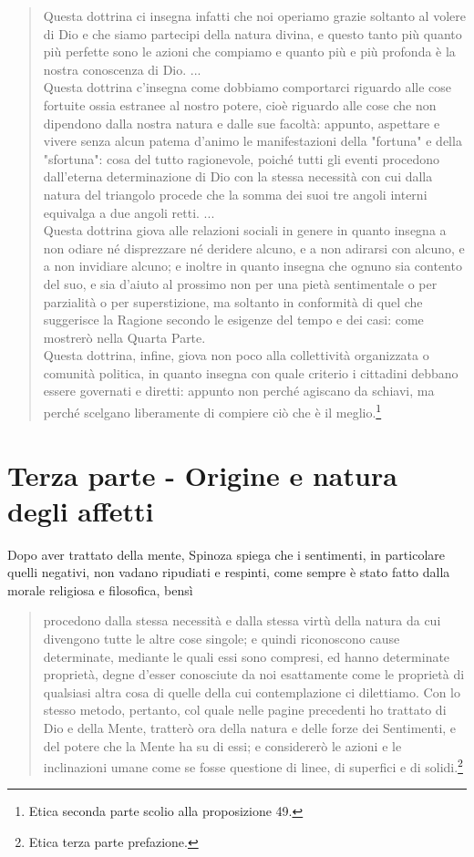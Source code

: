 \begin{quotation}
	\small Questa dottrina ci insegna infatti che noi operiamo grazie soltanto al volere di Dio e
	che siamo partecipi della natura divina, e questo tanto più quanto più perfette sono le azioni che compiamo e quanto più e più profonda è la nostra conoscenza di Dio. ...\\
	Questa dottrina c’insegna come dobbiamo comportarci riguardo alle cose fortuite ossia estranee al nostro potere, cioè riguardo alle cose che non dipendono dalla nostra natura
	e dalle sue facoltà: appunto, aspettare e vivere senza alcun patema d’animo le manifestazioni della "fortuna" e della "sfortuna": cosa del tutto ragionevole, poiché tutti gli eventi procedono dall’eterna determinazione di Dio con la stessa necessità con cui dalla natura del
	triangolo procede che la somma dei suoi tre angoli interni equivalga a due angoli retti. ...\\
	Questa dottrina giova alle relazioni sociali in genere in quanto insegna a non odiare né disprezzare né deridere alcuno, e a non adirarsi con alcuno, e a non invidiare alcuno; e
	inoltre in quanto insegna che ognuno sia contento del suo, e sia d’aiuto al prossimo non
	per una pietà sentimentale o per parzialità o per superstizione, ma soltanto in conformità
	di quel che suggerisce la Ragione secondo le esigenze del tempo e dei casi: come mostrerò
	nella Quarta Parte.\\
	Questa dottrina, infine, giova non poco alla collettività organizzata o comunità politica, in quanto insegna con quale criterio i cittadini debbano essere governati e diretti: appunto non perché agiscano da schiavi, ma perché scelgano liberamente di compiere ciò che
	è il meglio.\footnote{Etica seconda parte scolio alla proposizione 49.}
\end{quotation}
\newpage
\section{Terza parte - Origine e natura degli affetti}

Dopo aver trattato della mente, Spinoza spiega che i sentimenti, in particolare quelli negativi, non vadano ripudiati e respinti, come sempre è stato fatto dalla morale religiosa e filosofica, bensì

\begin{quotation}
	\small procedono dalla stessa necessità e dalla stessa virtù della natura da cui divengono tutte le altre cose singole; e quindi riconoscono cause determinate, mediante le quali
	essi sono compresi, ed hanno determinate proprietà, degne d’esser conosciute da noi esattamente come le proprietà di qualsiasi altra cosa di quelle della cui contemplazione ci dilettiamo. Con lo stesso metodo, pertanto, col quale nelle pagine precedenti ho trattato di Dio
	e della Mente, tratterò ora della natura e delle forze dei Sentimenti, e del potere che la
	Mente ha su di essi; e considererò le azioni e le inclinazioni umane come se fosse questione
	di linee, di superfici e di solidi.\footnote{Etica terza parte prefazione.}
\end{quotation}





